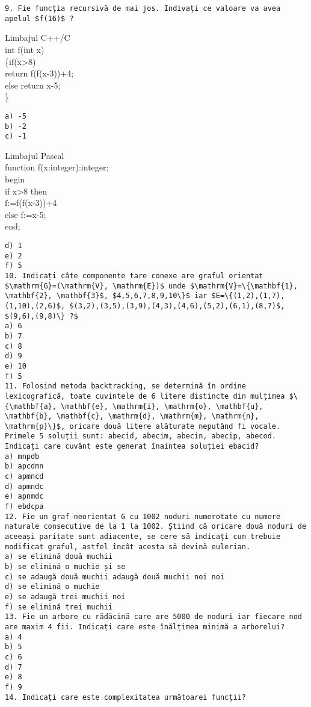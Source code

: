 \begin{verbatim}
9. Fie funcția recursivă de mai jos. Indivați ce valoare va avea apelul $f(16)$ ?
\end{verbatim}

Limbajul C++/C\\
int f(int x)\\
\{if(x>8)\\
return f(f(x-3))+4;\\
else return x-5;\\
\}

\begin{verbatim}
a) -5
b) -2
c) -1
\end{verbatim}

Limbajul Pascal\\
function f(x:integer):integer;\\
begin\\
if x>8 then\\
f:=f(f(x-3))+4\\
else f:=x-5;\\
end;

\begin{verbatim}
d) 1
e) 2
f) 5
10. Indicați câte componente tare conexe are graful orientat $\mathrm{G}=(\mathrm{V}, \mathrm{E})$ unde $\mathrm{V}=\{\mathbf{1}, \mathbf{2}, \mathbf{3}$, $4,5,6,7,8,9,10\}$ iar $E=\{(1,2),(1,7),(1,10),(2,6)$, $(3,2),(3,5),(3,9),(4,3),(4,6),(5,2),(6,1),(8,7)$, $(9,6),(9,8)\} ?$
a) 6
b) 7
c) 8
d) 9
e) 10
f) 5
11. Folosind metoda backtracking, se determină în ordine lexicografică, toate cuvintele de 6 litere distincte din mulțimea $\{\mathbf{a}, \mathbf{e}, \mathrm{i}, \mathrm{o}, \mathbf{u}, \mathbf{b}, \mathbf{c}, \mathrm{d}, \mathrm{m}, \mathrm{n}, \mathrm{p}\}$, oricare două litere alăturate neputând fi vocale. Primele 5 soluții sunt: abecid, abecim, abecin, abecip, abecod. Indicați care cuvânt este generat înaintea soluției ebacid?
a) mnpdb
b) apcdmn
c) apmncd
d) apmndc
e) apnmdc
f) ebdcpa
12. Fie un graf neorientat G cu 1002 noduri numerotate cu numere naturale consecutive de la 1 la 1002. Știind că oricare două noduri de aceeași paritate sunt adiacente, se cere să indicați cum trebuie modificat graful, astfel încât acesta să devină eulerian.
a) se elimină două muchii
b) se elimină o muchie și se
c) se adaugă două muchii adaugă două muchii noi noi
d) se elimină o muchie
e) se adaugă trei muchii noi
f) se elimină trei muchii
13. Fie un arbore cu rădăcină care are 5000 de noduri iar fiecare nod are maxim 4 fii. Indicați care este înălțimea minimă a arborelui?
a) 4
b) 5
c) 6
d) 7
e) 8
f) 9
14. Indicați care este complexitatea următoarei funcții?
\end{verbatim}

